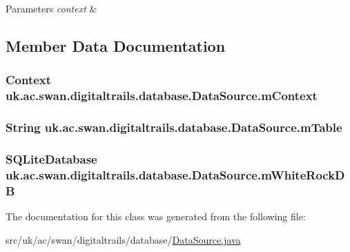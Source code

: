 \begin{DoxyParams}{Parameters}
{\em context} & \\
\hline
\end{DoxyParams}


\subsection{Member Data Documentation}
\hypertarget{classuk_1_1ac_1_1swan_1_1digitaltrails_1_1database_1_1_data_source_a1daf2406165149f28205c4ac895ee858}{
\subsubsection[{m\+Context}]{\setlength{\rightskip}{0pt plus 5cm}Context uk.\+ac.\+swan.\+digitaltrails.\+database.\+Data\+Source.\+m\+Context\hspace{0.3cm}{\ttfamily [protected]}}}\label{classuk_1_1ac_1_1swan_1_1digitaltrails_1_1database_1_1_data_source_a1daf2406165149f28205c4ac895ee858}
\hypertarget{classuk_1_1ac_1_1swan_1_1digitaltrails_1_1database_1_1_data_source_a5a038e9db6a268c1f8f70d74f0981e93}{
\subsubsection[{m\+Table}]{\setlength{\rightskip}{0pt plus 5cm}String uk.\+ac.\+swan.\+digitaltrails.\+database.\+Data\+Source.\+m\+Table\hspace{0.3cm}{\ttfamily [protected]}}}\label{classuk_1_1ac_1_1swan_1_1digitaltrails_1_1database_1_1_data_source_a5a038e9db6a268c1f8f70d74f0981e93}
\hypertarget{classuk_1_1ac_1_1swan_1_1digitaltrails_1_1database_1_1_data_source_aafb91ad4da9b6ea6520f1268f9a6771d}{
\subsubsection[{m\+White\+Rock\+D\+B}]{\setlength{\rightskip}{0pt plus 5cm}S\+Q\+Lite\+Database uk.\+ac.\+swan.\+digitaltrails.\+database.\+Data\+Source.\+m\+White\+Rock\+D\+B\hspace{0.3cm}{\ttfamily [protected]}}}\label{classuk_1_1ac_1_1swan_1_1digitaltrails_1_1database_1_1_data_source_aafb91ad4da9b6ea6520f1268f9a6771d}


The documentation for this class was generated from the following file\+:\begin{DoxyCompactItemize}
\item 
src/uk/ac/swan/digitaltrails/database/\hyperlink{_data_source_8java}{Data\+Source.\+java}\end{DoxyCompactItemize}
